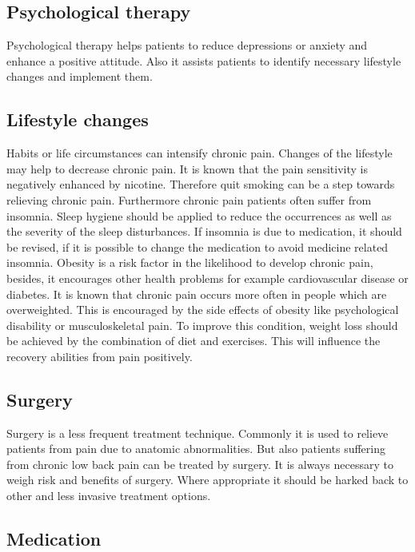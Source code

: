 \subsection{Psychological therapy}

Psychological therapy helps patients to reduce depressions or anxiety and enhance a positive attitude. Also it assists patients to identify necessary lifestyle changes and implement them. \cite{marcus2009,pope2017}

\subsection{Lifestyle changes}

Habits or life circumstances can intensify chronic pain. Changes of the lifestyle may help to decrease chronic pain. It is known that the pain sensitivity is negatively enhanced by nicotine. Therefore quit smoking can be a step towards relieving chronic pain.
Furthermore chronic pain patients often suffer from insomnia. Sleep hygiene should be applied to reduce the occurrences as well as the severity of the sleep disturbances. If insomnia is due to medication, it should be revised, if it is possible to change the medication to avoid medicine related insomnia.
Obesity is a risk factor in the likelihood to  develop chronic pain, besides, it encourages other health problems for example cardiovascular disease or diabetes. It is known that chronic pain occurs more often in people which are overweighted. This is encouraged by the side effects of obesity like psychological disability or musculoskeletal pain. To improve this condition, weight loss should be achieved by the combination of diet and exercises. This will influence the recovery abilities from pain positively. \cite{marcus2009,pope2017}

\subsection{Surgery}

Surgery is a less frequent treatment technique. Commonly it is used to relieve patients from pain due to anatomic abnormalities. \cite{marcus2009,pope2017} But also patients suffering from chronic low back pain can be treated by surgery. It is always necessary to weigh risk and benefits of surgery. Where appropriate it should be harked back to other and less invasive treatment options. \cite{pope2017}

\subsection{Medication}

